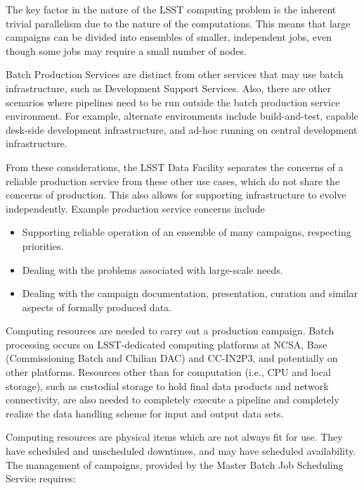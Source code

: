 The key factor in the nature of the LSST computing problem is the inherent
trivial parallelism due to the nature of the computations. This means that large
campaigns can be divided into ensembles of smaller, independent jobs, even
though some jobs may require a small number of nodes.

Batch Production Services are distinct from other services that may use batch
infrastructure, such as Development Support Services. Also, there are other
scenarios where pipelines need to be run outside the batch production service
environment.  For example, alternate environments include build-and-test,
capable desk-side development infrastructure, and ad-hoc running on central
development infrastructure.

From these considerations, the LSST Data Facility separates the concerns of a
reliable production service from these other use cases, which do not share the
concerns of production. This also allows for supporting infrastructure to evolve
independently. Example production service concerns include

\begin{itemize}

\item Supporting reliable operation of an ensemble of many campaigns, respecting
priorities.

\item Dealing with the problems associated with large-scale needs.

\item Dealing with the campaign documentation, presentation, curation and similar
aspects of formally produced data.

\end{itemize}

Computing resources are needed to carry out a production campaign. Batch processing occurs
on LSST-dedicated computing platforms at NCSA, Base (Commissioning Batch and Chilian DAC) and CC-IN2P3, and potentially on
other platforms. Resources other than for computation (i.e., CPU and local
storage), such as custodial storage to hold final data products and network
connectivity, are also needed to completely execute a pipeline and completely
realize the data handling scheme for input and output data sets.

Computing resources are physical items which are not always fit for use. They
have scheduled and unscheduled downtimes, and may have scheduled availability.
The management of campaigns, provided by the Master Batch Job Scheduling Service
requires:

